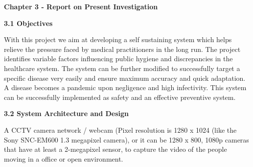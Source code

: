\documentclass[12pt]{article}
\begin{document}
\begin{Center}
{\fontsize{18pt}{21.6pt}\selectfont \textbf{Chapter 3 - Report on Present Investigation}}
\vspace{\baselineskip}

\end{Center}
\begin{FlushLeft}
{\fontsize{14pt}{16.8pt}\selectfont \textbf{3.1 Objectives }}
\end{FlushLeft}
\begin{FlushLeft}
With this project we aim at developing a self sustaining system which helps relieve the pressure faced by medical practitioners in the long run. The project identifies variable factors influencing public hygiene and discrepancies in the healthcare system. The system can be further modified to successfully target a specific disease very easily and ensure maximum accuracy and quick adaptation. A disease becomes a pandemic upon negligence and high infectivity. This system can be successfully implemented as safety and an effective preventive system.
\end{FlushLeft}

\vspace{\baselineskip}
\begin{justify}
{\fontsize{14pt}{16.8pt}\selectfont \textbf{3.2 System Architecture and Design}}
\end{justify}
\vspace{\baselineskip}
\setlength{\parskip}{0.0pt}
\begin{justify}
A CCTV camera network / webcam (Pixel resolution is 1280 x 1024 (like the Sony SNC-EM600 1.3 megapixel camera), or it can be 1280 x 800, 1080p cameras that have at least a 2-megapixel sensor, to capture the video of the people moving in a office or open environment.
\end{justify}
\end{document}
